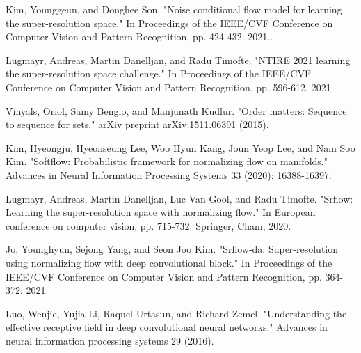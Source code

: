\documentclass{article}
\begin{document}
\begin{thebibliography}{9}
    Kim, Younggeun, and Donghee Son. "Noise conditional flow model for learning the super-resolution space." In Proceedings of the IEEE/CVF Conference on Computer Vision and Pattern Recognition, pp. 424-432. 2021..

    Lugmayr, Andreas, Martin Danelljan, and Radu Timofte. "NTIRE 2021 learning the super-resolution space challenge." In Proceedings of the IEEE/CVF Conference on Computer Vision and Pattern Recognition, pp. 596-612. 2021.
    
    Vinyals, Oriol, Samy Bengio, and Manjunath Kudlur. "Order matters: Sequence to sequence for sets." arXiv preprint arXiv:1511.06391 (2015).

    Kim, Hyeongju, Hyeonseung Lee, Woo Hyun Kang, Joun Yeop Lee, and Nam Soo Kim. "Softflow: Probabilistic framework for normalizing flow on manifolds." Advances in Neural Information Processing Systems 33 (2020): 16388-16397.    

    Lugmayr, Andreas, Martin Danelljan, Luc Van Gool, and Radu Timofte. "Srflow: Learning the super-resolution space with normalizing flow." In European conference on computer vision, pp. 715-732. Springer, Cham, 2020.
     
    Jo, Younghyun, Sejong Yang, and Seon Joo Kim. "Srflow-da: Super-resolution using normalizing flow with deep convolutional block." In Proceedings of the IEEE/CVF Conference on Computer Vision and Pattern Recognition, pp. 364-372. 2021.

    Luo, Wenjie, Yujia Li, Raquel Urtasun, and Richard Zemel. "Understanding the effective receptive field in deep convolutional neural networks." Advances in neural information processing systems 29 (2016).


\end{thebibliography}
\end{document}
